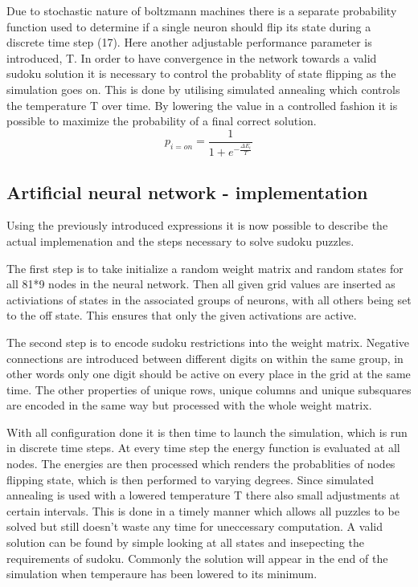 \documentclass[a4paper,11pt]{kth-mag}
\begin{document}
Due to stochastic nature of boltzmann machines there is a separate probability function used to determine if a single neuron should flip its state during a discrete time step (17). Here another adjustable performance parameter is introduced, T. In order to have convergence in the network towards a valid sudoku solution it is necessary to control the probablity of state flipping as the simulation goes on. This is done by utilising simulated annealing which controls the temperature T over time. By lowering the value in a controlled fashion it is possible to maximize the probability of a final correct solution.
\[
p_{i=on} = \frac{1}{1+e^{-\frac{\Delta E_{i}}{T}}}
\]

\subsection{Artificial neural network - implementation}

Using the previously introduced expressions it is now possible to describe the actual implemenation and the steps necessary to solve sudoku puzzles.
\newline

The first step is to take initialize a random weight matrix and random states for all 81*9 nodes in the neural network. Then all given grid values are inserted as activiations of states in the associated groups of neurons, with all others being set to the off state. This ensures that only the given activations are active.
\newline

The second step is to encode sudoku restrictions into the weight matrix. Negative connections are introduced between different digits on within the same group, in other words only one digit should be active on every place in the grid at the same time. The other properties of unique rows, unique columns and unique subsquares are encoded in the same way but processed with the whole weight matrix.
\newline

With all configuration done it is then time to launch the simulation, which is run in discrete time steps. At every time step the energy function is evaluated at all nodes. The energies are then processed which renders the probablities of nodes flipping state, which is then performed to varying degrees. Since simulated annealing is used with a lowered temperature T there also small adjustments at certain intervals. This is done in a timely manner which allows all puzzles to be solved but still doesn't waste any time for uneccessary computation.
\newline
A valid solution can be found by simple looking at all states and insepecting the requirements of sudoku. Commonly the solution will appear in the end of the simulation when temperaure has been lowered to its minimum.
\end{document}
